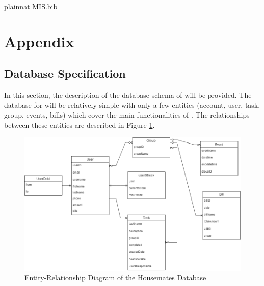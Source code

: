 \documentclass[12pt, titlepage]{article}
\begin{document}


\newpage

 {plainnat}
 {MIS.bib}

\newpage

\section{Appendix} \label{Appendix}

\subsection{Database Specification} \label{Database}
In this section, the description of the database schema of \progname{} will be provided. The database for \progname{} will be relatively simple with only a few entities (account, user, task, group, events, bills) which cover the main functionalities of \progname{}. The relationships between these entities are described in Figure \ref{FigDB}.

\begin{figure}[H]
\centering
\includegraphics[width=\linewidth]{Database.png}
\caption{Entity-Relationship Diagram of the Housemates Database}
\label{FigDB}
\end{figure}
\end{document}
